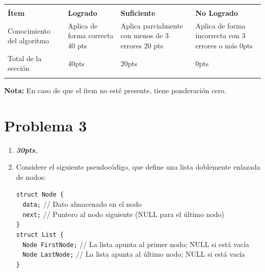 \documentclass{exam}
\begin{document}
\begin{enumerate}
\begin{questions}
\begin{enumerate}
    \end{enumerate}
    
  \end{questions}

  \begin{table}[H]
    \centering
    \begin{tabular}{
      !{\color{gray!50}\vrule}p{3.9cm}
      !{\color{gray!50}\vrule}p{3.6cm}
      !{\color{gray!50}\vrule}p{3.6cm}
      !{\color{gray!50}\vrule}p{3.6cm}
      !{\color{gray!50}\vrule}}  \hline
       \\  \hline
      \textbf{Ítem} & \textbf{Logrado} & \textbf{Suficiente} & \textbf{No Logrado}\\  \hline
      Conocimiento del algoritmo &
      Aplica de forma correcta 40 pts   &
      Aplica parcialmente con menos de 3 errores 20 pts  &
      Aplica de forma incorrecta con 3 errores o más 0pts\\  \hline


      Total de la sección &  40pts & 20pts & 0pts\\  \hline
    \end{tabular}
    \label{tbl:1}
  \end{table}
  \vspace{-5mm}
  \textbf{Nota:} En caso de que el {í}tem no est{é} presente, tiene ponderaci{ó}n cero.

  \newpage
  \vspace{-7mm}
  \section{\textbf{Problema 3}}
  \noindent
  \begin{questions}

    \begin{enumerate}
    \item \textbf{\emph{30pts.}}

    \item Considere el siguiente pseudocódigo, que define una lista doblemente enlazada de nodos:

    \texttt{struct Node \{}\\
    $~~~~$\texttt{data;} \tabto{23ex}// Dato almacenado en el nodo\\
    $~~~~$\texttt{next;} \tabto{23ex}// Puntero al nodo siguiente (NULL para el último nodo)\\
    \texttt{\}}\\
    \texttt{struct List \{}\\
    $~~~~$\texttt{Node FirstNode;} \tabto{23ex}// La lista apunta al primer nodo; NULL si está vacía\\
    $~~~~$\texttt{Node LastNode;} \tabto{23ex}// La lista apunta al último nodo; NULL si está vacía\\
    \texttt{\}}


\end{enumerate}
\end{questions}
\end{enumerate}
\end{document}
